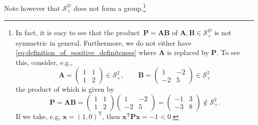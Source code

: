 \documentclass[12pt,a4paper]{article}
\begin{document}
Note however that $\mathcal{S}_{+}^{D}$ does not form a group.\footnote{%
In fact, it is easy to see that the product~$\mathbf{P} = \mathbf{A}\mathbf{B}$ of
$\mathbf{A}, \mathbf{B} \in \mathcal{S}_{+}^{D}$ is not symmetric in general.
Furthermore, we do not either have \eqref{eq:definition_of_positive_definiteness}
where $\mathbf{A}$ is replaced by $\mathbf{P}$.
To see this, consider, e.g.,
\begin{equation}
\mathbf{A} =
\begin{pmatrix}
1 & 1 \\
1 & 2
\end{pmatrix} \in \mathcal{S}_{+}^{2}, \qquad
\mathbf{B} =
\begin{pmatrix}
1 & -2 \\
-2 & 5
\end{pmatrix} \in \mathcal{S}_{+}^{2}
\end{equation}
the product of which is given by
\begin{equation}
\mathbf{P} = \mathbf{A}\mathbf{B} =
\begin{pmatrix}
1 & 1 \\
1 & 2
\end{pmatrix}
\begin{pmatrix}
1 & -2 \\
-2 & 5
\end{pmatrix} =
\begin{pmatrix}
-1 & 3 \\
-3 & 8
\end{pmatrix} \not\in \mathcal{S}_{+}^{2} .
\end{equation}
If we take, e.g, $\mathbf{x} = \left( 1, 0 \right)^{\operatorname{T}}$,
then $\mathbf{x}^{\operatorname{T}}\mathbf{P}\mathbf{x} = -1 < 0$.}
\end{document}
